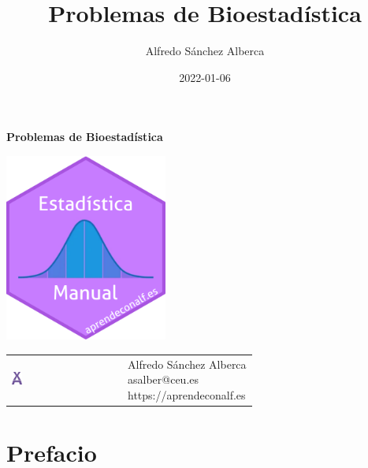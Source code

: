 \documentclass[
  a4paper,
]{scrreport}
\title{Problemas de Bioestadística}
\author{Alfredo Sánchez Alberca}
\date{2022-01-06}
\renewcommand*\contentsname{Tabla de contenidos}
\newcommand\contentsname{Tabla de contenidos}
\theoremstyle{definition}
\theoremstyle{remark}
\begin{document}
\begin{titlepage}

\begin{center}
\vspace*{5cm}

\Huge
{\textbf{\textsf{Problemas de Bioestadística}}}

\vspace{0.5cm}
\LARGE
{\textbf{\textsf{}}}

\vspace{1.5cm}

\includegraphics[width=0.4\textwidth]{img/logos/sticker.png}
\end{center}

\vfill

\begin{flushleft}
\begin{tabular}{ll}
\includegraphics[width=0.1\textwidth]{img/logos/aprendeconalf.png} & \parbox[b]{5cm}{\Large\textsf{Alfredo
Sánchez
Alberca}\\ \textsf{asalber@ceu.es} \\ \textsf{https://aprendeconalf.es}}
\end{tabular}
\end{flushleft}
\end{titlepage}
\renewcommand*\contentsname{Tabla de contenidos}
{
\hypersetup{linkcolor=}
\setcounter{tocdepth}{2}
\tableofcontents
}


\chapter*{Prefacio}\label{prefacio}
\end{document}
